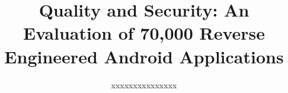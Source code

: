 \documentclass{sig-alternate}
\newif\ifisnopii
\begin{document}
\title{Quality and Security: An Evaluation of 70,000 Reverse Engineered Android Applications}



%
\ifisnopii %
\author{
%
\alignauthor
Daniel~E.~Krutz~\&~Samuel~A.~Malachowsky\\ 	
	\affaddr{Software Engineering Department}\\
       \affaddr{Rochester Institute of Technology}\\
       \affaddr{1 Lomb Memorial Drive}\\
       \affaddr{Rochester, NY, USA} \\
       \email{\{dxkvse, samvse\}@rit.edu}
       \alignauthor
} %

\else %
\author{
%
\alignauthor
xxxxxxxxxxxxxxx\\ 	
	\\
       \\
       \\
        \\
       \alignauthor
} %
\fi %
\end{document}
